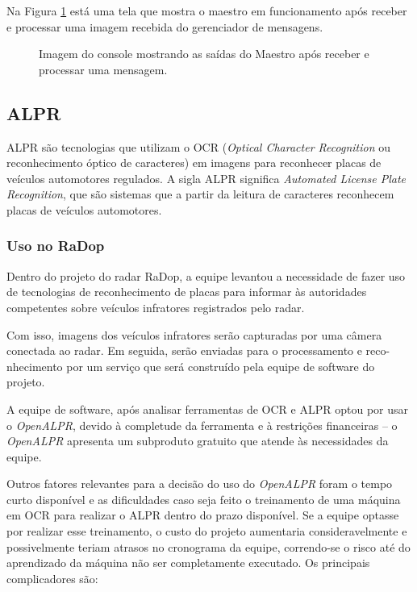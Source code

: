 Na Figura \ref{fig:maestro-tela} está uma tela que mostra o maestro em funcionamento após receber e processar uma imagem recebida do gerenciador de mensagens.

\begin{figure}[!h]
	\caption{\label{fig:maestro-tela} Imagem do console mostrando as saídas do Maestro após receber e processar uma mensagem.}
\end{figure}

\subsection{ALPR}

ALPR são tecnologias que utilizam o OCR (\textit{Optical Character Recognition} ou reconhecimento óptico de caracteres) em imagens para reconhecer placas de veículos automotores regulados. A sigla ALPR significa \textit{Automated License Plate Recognition}, que são sistemas que a partir da leitura de caracteres reconhecem placas de veículos automotores.

\subsubsection{Uso no RaDop}

Dentro do projeto do radar RaDop, a equipe levantou a necessidade de fazer uso de tecnologias de reconhecimento de placas para informar às autoridades competentes sobre veículos infratores registrados pelo radar.

Com isso, imagens dos veículos infratores serão capturadas por uma câmera conectada ao radar. Em seguida, serão enviadas para o processamento e reco-nhecimento por um serviço que será construído pela equipe de software do projeto.

A equipe de software, após analisar ferramentas de OCR e ALPR optou por usar o \textit{OpenALPR}, devido à completude da ferramenta e à restrições financeiras -- o \textit{OpenALPR} apresenta um subproduto gratuito que atende às necessidades da equipe.

Outros fatores relevantes para a decisão do uso do \textit{OpenALPR} foram o tempo curto disponível e as dificuldades caso seja feito o treinamento de uma máquina em OCR para realizar o ALPR dentro do prazo disponível. Se a equipe optasse por realizar esse treinamento, o custo do projeto aumentaria consideravelmente e possivelmente teriam atrasos no cronograma da equipe, correndo-se o risco até do aprendizado da máquina não ser completamente executado. Os principais complicadores são:

